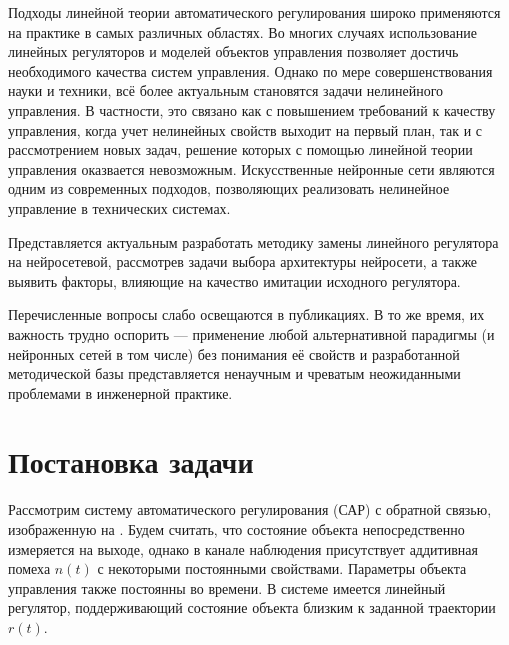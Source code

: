 
Подходы линейной теории автоматического регулирования широко
применяются на практике в самых различных областях.  Во многих случаях
использование линейных регуляторов и моделей объектов управления
позволяет достичь необходимого качества систем управления.  Однако по
мере совершенствования науки и техники, всё более актуальным
становятся задачи нелинейного управления.  В частности, это связано
как с повышением требований к качеству управления, когда учет
нелинейных свойств выходит на первый план, так и с рассмотрением новых
задач, решение которых с помощью линейной теории управления оказвается
невозможным.  Искусственные нейронные сети являются одним из
современных подходов, позволяющих реализовать нелинейное управление в
технических системах.


Представляется актуальным разработать методику замены линейного
регулятора на нейросетевой, рассмотрев задачи выбора архитектуры
нейросети, а также выявить факторы, влияющие на качество имитации
исходного регулятора.


Перечисленные вопросы слабо освещаются в публикациях.  В то же время,
их важность трудно оспорить --- применение любой альтернативной
парадигмы (и нейронных сетей в том числе) без понимания её свойств и
разработанной методической базы представляется ненаучным и чреватым
неожиданными проблемами в инженерной практике.

\section{Постановка задачи}

Рассмотрим систему автоматического регулирования (САР) с обратной
связью, изображенную на .  Будем считать, что
состояние объекта непосредственно измеряется на выходе, однако в
канале наблюдения присутствует аддитивная помеха $n(t)$ с некоторыми
постоянными свойствами.  Параметры объекта управления также постоянны
во времени.  В системе имеется линейный регулятор, поддерживающий
состояние объекта близким к заданной траектории $r(t)$.

